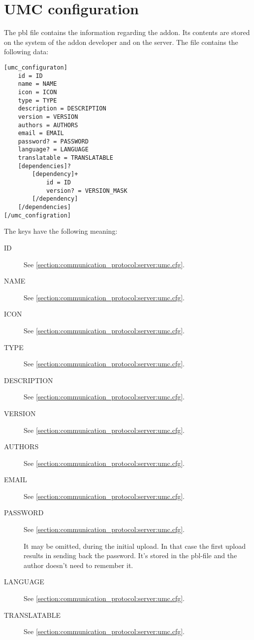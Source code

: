 \section{UMC configuration}
\label{section:communication_protocol:umc}

The pbl file contains the information regarding the addon. Its contents are
stored on the system of the addon developer and on the server. The file
contains the following data:

\begin{lstlisting}
[umc_configuraton]
	id = ID
	name = NAME
	icon = ICON
	type = TYPE
	description = DESCRIPTION
	version = VERSION
	authors = AUTHORS
	email = EMAIL
	password? = PASSWORD
	language? = LANGUAGE
	translatable = TRANSLATABLE
	[dependencies]?
		[dependency]+
			id = ID
			version? = VERSION_MASK
		[/dependency]
	[/dependencies]
[/umc_configration]
\end{lstlisting}

The keys have the following meaning:
\begin{description}
\item[ID]
	See \cref{section:communication_protocol:server:umc.cfg}.

\item[NAME]
	See \cref{section:communication_protocol:server:umc.cfg}.

\item[ICON]
	See \cref{section:communication_protocol:server:umc.cfg}.

\item[TYPE]
	See \cref{section:communication_protocol:server:umc.cfg}.

\item[DESCRIPTION]
	See \cref{section:communication_protocol:server:umc.cfg}.

\item[VERSION]
	See \cref{section:communication_protocol:server:umc.cfg}.

\item[AUTHORS]
	See \cref{section:communication_protocol:server:umc.cfg}.

\item[EMAIL]
	See \cref{section:communication_protocol:server:umc.cfg}.

\item[PASSWORD]
	See \cref{section:communication_protocol:server:umc.cfg}.

	It may be omitted, during the initial upload. In that case the first
	upload results in sending back the password. It's stored in the pbl-file
	and the author doesn't need to remember it.

\item[LANGUAGE]
	See \cref{section:communication_protocol:server:umc.cfg}.

\item[TRANSLATABLE]
	See \cref{section:communication_protocol:server:umc.cfg}.

\end{description}

